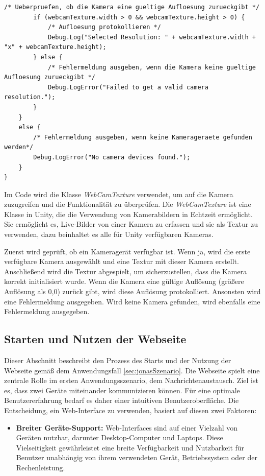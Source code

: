 \begin{itemize}
\begin{lstlisting}[style=csharp, caption={Debug Funktion von der Kamera Benutzung}, label=code:debugRaycast]
        /* Ueberpruefen, ob die Kamera eine gueltige Aufloesung zurueckgibt */
        if (webcamTexture.width > 0 && webcamTexture.height > 0) {
            /* Aufloesung protokollieren */
            Debug.Log("Selected Resolution: " + webcamTexture.width + "x" + webcamTexture.height);
        } else {
            /* Fehlermeldung ausgeben, wenn die Kamera keine gueltige Aufloesung zurueckgibt */
            Debug.LogError("Failed to get a valid camera resolution.");
        }
    }
    else {
        /* Fehlermeldung ausgeben, wenn keine Kamerageraete gefunden  werden*/
        Debug.LogError("No camera devices found.");
    }
}
    \end{lstlisting}
    Im Code wird die Klasse \textit{WebCamTexture} verwendet, um auf die Kamera zuzugreifen und die Funktionalität zu überprüfen. Die \textit{WebCamTexture} ist eine Klasse in Unity, die die Verwendung von Kamerabildern in Echtzeit ermöglicht. Sie ermöglicht es, Live-Bilder von einer Kamera zu erfassen und sie als Textur zu verwenden, dazu beinhaltet es alle für Unity verfügbaren Kameras.

    Zuerst wird geprüft, ob ein Kameragerät verfügbar ist. Wenn ja, wird die erste verfügbare Kamera ausgewählt und eine Textur mit dieser Kamera erstellt. Anschließend wird die Textur abgespielt, um sicherzustellen, dass die Kamera korrekt initialisiert wurde. Wenn die Kamera eine gültige Auflösung (größere Auflösung als 0,0) zurück gibt, wird diese Auflösung protokolliert. Ansonsten wird eine Fehlermeldung ausgegeben. Wird keine Kamera gefunden, wird ebenfalls eine Fehlermeldung ausgegeben.


\subsection{Starten und Nutzen der Webseite}
Dieser Abschnitt beschreibt den Prozess des Starts und der Nutzung der Webseite gemäß dem Anwendungsfall \ref{sec:jonasSzenario}. Die Webseite spielt eine zentrale Rolle im ersten Anwendungsszenario, dem Nachrichtenaustausch. Ziel ist es, dass zwei Geräte miteinander kommunizieren können. Für eine optimale Benutzererfahrung bedarf es daher einer intuitiven Benutzeroberfläche. Die Entscheidung, ein Web-Interface zu verwenden, basiert auf diesen zwei Faktoren:

\begin{itemize}
    \item \textbf{Breiter Geräte-Support:} Web-Interfaces sind auf einer Vielzahl von Geräten nutzbar, darunter Desktop-Computer und Laptops. Diese Vielseitigkeit gewährleistet eine breite Verfügbarkeit und Nutzbarkeit für Benutzer unabhängig von ihrem verwendeten Gerät, Betriebssystem oder der Rechenleistung.


\end{itemize}
\end{itemize}
